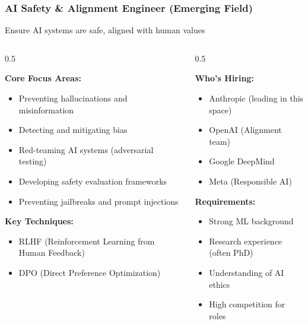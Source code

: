 \begin{frame}[fragile]\frametitle{AI Safety \& Alignment Engineer (Emerging Field)}

Ensure AI systems are safe, aligned with human values


\begin{columns}
    \begin{column}[T]{0.5\linewidth}


\textbf{Core Focus Areas:}
\begin{itemize}
\item Preventing hallucinations and misinformation
\item Detecting and mitigating bias
\item Red-teaming AI systems (adversarial testing)
\item Developing safety evaluation frameworks
\item Preventing jailbreaks and prompt injections
\end{itemize}

\textbf{Key Techniques:}
\begin{itemize}
\item RLHF (Reinforcement Learning from Human Feedback)
\item DPO (Direct Preference Optimization)
\end{itemize}
    \end{column}
    \begin{column}[T]{0.5\linewidth}

\textbf{Who's Hiring:}
\begin{itemize}
\item Anthropic (leading in this space)
\item OpenAI (Alignment team)
\item Google DeepMind
\item Meta (Responsible AI)
\end{itemize}

\textbf{Requirements:}
\begin{itemize}
\item Strong ML background
\item Research experience (often PhD)
\item Understanding of AI ethics
\item High competition for roles
\end{itemize}


\end{column}
\end{columns}
\end{frame}
